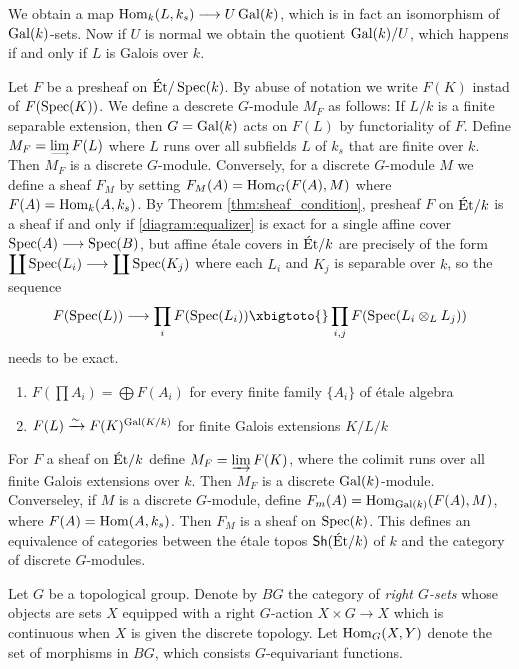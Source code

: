 We obtain a map $\operatorname{Hom}_k(L,k_s) \longrightarrow U \operatorname{Gal}(k)$, which is in fact an isomorphism of $\operatorname{Gal}(k)$-sets. Now if $U$ is normal we obtain the quotient $\operatorname{Gal}(k)/U$, which happens if and only if $L$ is Galois over $k$.


\begin{construction}
	Let $F$ be a presheaf on $\text{\'Et}/\operatorname{Spec}(k)$. By abuse of notation we write $F(K)$ instad of $F(\operatorname{Spec}(K))$. We define a descrete $G$-module $M_F$ as follows: If $L/k$ is a finite separable extension, then $G = \operatorname{Gal}(k)$ acts on $F(L)$ by functoriality of $F$. Define $M_F = \colim F(L)$ where $L$ runs over all subfields $L$ of $k_s$ that are finite over $k$. Then $M_F$ is a discrete $G$-module. Conversely, for a discrete $G$-module $M$ we define a sheaf $F_M$ by setting $F_M(A) = \operatorname{Hom}_G(F(A),M)$ where $F(A) = \operatorname{Hom}_k(A,k_s)$. By Theorem \ref{thm:sheaf_condition}, presheaf $F$ on $\text{\'Et}/k$ is a sheaf if and only if \ref{diagram:equalizer} is exact for a single affine cover $\operatorname{Spec}(A) \longrightarrow \operatorname{Spec}(B)$, but affine \'etale covers in $\text{\'Et}/k$ are precisely of the form $\displaystyle \coprod \operatorname{Spec}(L_i) \longrightarrow \displaystyle \coprod \operatorname{Spec}(K_j)$ where each $L_i$ and $K_j$ is separable over $k$, so the sequence \[ F(\Spec(L)) \to \prod_{i} F(\Spec(L_i)) \xbigtoto{} \prod_{i,j} F(\Spec(L_i \otimes_L L_j)) \] needs to be exact.
\end{construction}

\begin{enumerate}
	\item $F(\prod A_i) = \bigoplus F(A_i)$ for every finite family $\{A_i\}$ of \'etale algebra
	\item $F(L) \xrightarrow{\sim} F(K)^{\operatorname{Gal}(K/k)}$ for finite Galois extensions $K/L/k$
\end{enumerate}

For $F$ a sheaf on $\text{\'Et}/k$ define $M_F = \varinjlim F(K)$, where the colimit runs over all finite Galois extensions over $k$. Then $M_F$ is a discrete $\operatorname{Gal}(k)$-module. Converseley, if $M$ is a discrete $G$-module, define $F_m(A) = \operatorname{Hom}_{\operatorname{Gal}(k)}(F(A),M)$, where $F(A) = \operatorname{Hom}(A, k_s)$. Then $F_M$ is a sheaf on $\operatorname{Spec}(k)$. This defines an equivalence of categories between the \'etale topos $\operatorname{\mathsf{Sh}}(\text{\'Et}/k)$ of $k$ and the category of discrete $G$-modules.

\begin{construction}
	Let $G$ be a topological group. Denote by $BG$ the category of \textit{right $G$-sets} whose objects are sets $X$ equipped with a right $G$-action $X \times G \to X$ which is continuous when $X$ is given the discrete topology. Let $\operatorname{Hom}_G(X,Y)$ denote the set of morphisms in $BG$, which consists $G$-equivariant functions.
\end{construction}



